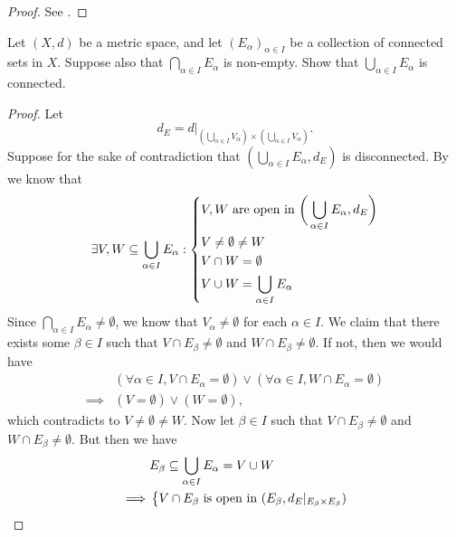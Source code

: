 \begin{proof}
  See .
\end{proof}

\begin{ex}\label{ii:ex:2.4.6}
  Let \((X, d)\) be a metric space, and let \((E_\alpha)_{\alpha \in I}\) be a collection of connected sets in \(X\).
  Suppose also that \(\bigcap_{\alpha \in I} E_\alpha\) is non-empty.
  Show that \(\bigcup_{\alpha \in I} E_\alpha\) is connected.
\end{ex}

\begin{proof}
  Let
  \[
    d_E = d|_{(\bigcup_{\alpha \in I} V_\alpha) \times (\bigcup_{\alpha \in I} V_\alpha)}.
  \]
  Suppose for the sake of contradiction that \((\bigcup_{\alpha \in I} E_\alpha, d_E)\) is disconnected.
  By  we know that
  \[
    \exists V, W \subseteq \bigcup_{\alpha \in I} E_\alpha : \begin{dcases}
      V, W \text{ are open in } \bigg(\bigcup_{\alpha \in I} E_\alpha, d_E\bigg) \\
      V \neq \emptyset \neq W                                                    \\
      V \cap W = \emptyset                                                       \\
      V \cup W = \bigcup_{\alpha \in I} E_\alpha
    \end{dcases}
  \]
  Since \(\bigcap_{\alpha \in I} E_\alpha \neq \emptyset\), we know that \(V_\alpha \neq \emptyset\) for each \(\alpha \in I\).
  We claim that there exists some \(\beta \in I\) such that \(V \cap E_\beta \neq \emptyset\) and \(W \cap E_\beta \neq \emptyset\).
  If not, then we would have
  \begin{align*}
             & (\forall \alpha \in I, V \cap E_\alpha = \emptyset) \lor (\forall \alpha \in I, W \cap E_\alpha = \emptyset) \\
    \implies & (V = \emptyset) \lor (W = \emptyset),
  \end{align*}
  which contradicts to \(V \neq \emptyset \neq W\).
  Now let \(\beta \in I\) such that \(V \cap E_\beta \neq \emptyset\) and \(W \cap E_\beta \neq \emptyset\).
  But then we have
  \begin{align*}
             & E_\beta \subseteq \bigcup_{\alpha \in I} E_\alpha = V \cup W                                      \\
    \implies & \begin{dcases}
                 V \cap E_\beta \text{ is open in } (E_\beta, d_E|_{E_\beta \times E_\beta}) \\

\end{dcases}
\end{align*}
\end{proof}
